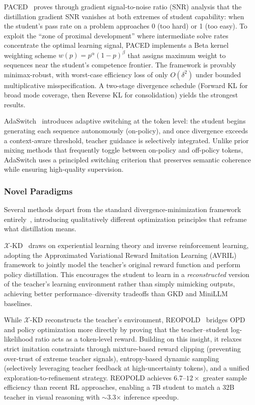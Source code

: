 \documentclass{article} %
\begin{document}
PACED~\citep{2603.11178} proves through gradient signal-to-noise ratio (SNR) analysis that the distillation gradient SNR vanishes at both extremes of student capability: when the student's pass rate on a problem approaches 0 (too hard) or 1 (too easy). To exploit the ``zone of proximal development'' where intermediate solve rates concentrate the optimal learning signal, PACED implements a Beta kernel weighting scheme $w(p) = p^\alpha(1{-}p)^\beta$ that assigns maximum weight to sequences near the student's competence frontier. The framework is provably minimax-robust, with worst-case efficiency loss of only $O(\delta^2)$ under bounded multiplicative misspecification. A two-stage divergence schedule (Forward KL for broad mode coverage, then Reverse KL for consolidation) yields the strongest results.

AdaSwitch~\citep{2510.07842} introduces adaptive switching at the token level: the student begins generating each sequence autonomously (on-policy), and once divergence exceeds a context-aware threshold, teacher guidance is selectively integrated. Unlike prior mixing methods that frequently toggle between on-policy and off-policy tokens, AdaSwitch uses a principled switching criterion that preserves semantic coherence while ensuring high-quality supervision.

\subsubsection{Novel Paradigms}

Several methods depart from the standard divergence-minimization framework entirely~\citep{2602.12674,2603.11137,2603.13260,2601.09088,2602.12222}, introducing qualitatively different optimization principles that reframe what distillation means.

$\mathcal{X}$-KD~\citep{2602.12674} draws on experiential learning theory and inverse reinforcement learning, adopting the Approximated Variational Reward Imitation Learning (AVRIL) framework to jointly model the teacher's original reward function and perform policy distillation. This encourages the student to learn in a \emph{reconstructed} version of the teacher's learning environment rather than simply mimicking outputs, achieving better performance--diversity tradeoffs than GKD and MiniLLM baselines.

While $\mathcal{X}$-KD reconstructs the teacher's environment, REOPOLD~\citep{2603.11137} bridges OPD and policy optimization more directly by proving that the teacher--student log-likelihood ratio acts as a token-level reward. Building on this insight, it relaxes strict imitation constraints through mixture-based reward clipping (preventing over-trust of extreme teacher signals), entropy-based dynamic sampling (selectively leveraging teacher feedback at high-uncertainty tokens), and a unified exploration-to-refinement strategy. REOPOLD achieves $6.7$--$12\times$ greater sample efficiency than recent RL approaches, enabling a 7B student to match a 32B teacher in visual reasoning with $\sim$3.3$\times$ inference speedup.
\end{document}
